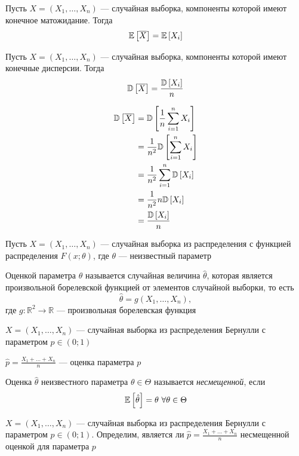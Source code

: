 \documentclass[a4paper, 10pt]{article}
\begin{document}
\state Пусть $X=(X_1,\ldots,X_n)$ — случайная выборка, компоненты которой имеют конечное матожидание. Тогда 
\begin{equation*}
    \mathbb{E}\left[\overline{X}\right]=\mathbb{E}\left[X_i\right]
\end{equation*}

\state Пусть $X=(X_1,\ldots,X_n)$ — случайная выборка, компоненты которой имеют конечные дисперсии. Тогда 
\begin{equation*}
    \mathbb{D}\left[\overline{X}\right]=\frac{\mathbb{D}\left[X_i\right]}{n}
\end{equation*}

\proof \begin{equation*}
    \begin{aligned}
        \dispersia{\overline{X}}&=\dispersia{\frac{1}{n}\sum_{i=1}^nX_i}\\
        &=\frac{1}{n^2}\dispersia{\sum_{i=1}^nX_i}\\
        &=\frac{1}{n^2}\sum_{i=1}^n\dispersia{X_i}\\
        &=\frac{1}{n^2}n\dispersia{X_i}\\
        &=\frac{\dispersia{X_i}}{n}
    \end{aligned}
\end{equation*}

 Пусть $X=(X_1,\ldots,X_n)$ — случайная выборка из распределения с функцией распределения $F(x;\theta)$, где $\theta$ — неизвестный параметр

Оценкой параметра $\theta$ называется случайная величина $\hat{\theta}$, которая является произвольной борелевской функцией от элементов случайной выборки, то есть
\begin{equation*}
    \hat{\theta}=g(X_1,\ldots,X_n),
\end{equation*}
где $g:\mathbb{R}^2\longrightarrow\mathbb{R}$ — произвольная борелевская функция

\ex  $X=(X_1,\ldots,X_n)$ — случайная выборка из распределения Бернулли с параметром $p\in(0;1)$

$\hat{p}=\displaystyle\frac{X_1+\ldots+X_n}{n}$ — оценка параметра $p$

 Оценка $\hat{\theta}$ неизвестного параметра $\theta\in\Theta$ называется \textit{несмещенной}, если 
\begin{equation*}
    \matwait{\hat{\theta}}=\theta\ \forall\theta\in\Theta
\end{equation*}

\ex  $X=(X_1,\ldots,X_n)$ — случайная выборка из распределения Бернулли с параметром $p\in(0;1)$. Определим, является ли $\hat{p}=\frac{X_1+\ldots+X_n}{n}$ несмещенной оценкой для параметра $p$
\end{document}
